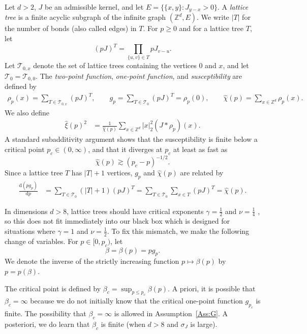 \documentclass[11pt,a4paper]{article}
\numberwithin{equation}{section}
\theoremstyle{plain}
\theoremstyle{definition}
\newcommand\1{\mathds{1}}
\begin{document}
Let $d > 2$, $J$ be an admissible kernel, and let $E = \{\{x,y\}: J_{y-x}>0 \}$.
A \emph{lattice tree} is a finite acyclic subgraph of
the infinite graph $(\mathbb Z^d, E)$.
We write $|T|$ for the number of bonds (also called edges) in $T$.
For $p \ge 0$ and for a lattice tree $T$, let
\begin{equation}
    (p J)^T = \prod_{\{u,v\} \in T}p J_{v-u}.
\end{equation}
Let $\mathcal{T}_{0,x}$ denote the set of lattice trees containing
the vertices $0$ and $x$, and let $\mathcal T_0 = \mathcal T_{0,0}$.
The \emph{two-point function}, \emph{one-point function}, and \emph{susceptibility}
are defined by
\begin{align}
    \rho_p(x) = \sum_{T \in \mathcal{T}_{0,x}} (pJ) ^{T},
    \qquad
    g_p = \sum_{T \in \mathcal{T}_{0}} (pJ) ^{T} = \rho_p(0),
    \qquad
    \hat\chi(p) = \sum_{x\in \mathbb Z^d} \rho_p(x).
\end{align}
We also define
\begin{align}
    \hat\xi(p)^2 &= \frac{1}{\hat\chi(p)}\sum_{x \in \mathbb{Z}^d} |x|_2^2
    (J*\rho_p)(x).
\end{align}
 A standard subadditivity argument  \cite{BFG86,HS90b}
shows that the susceptibility is finite below a critical point $p_c\in (0,\infty)$,
and that it diverges at $p_c$ at least as fast as
\begin{equation}
\label{eq:chihat-diverges}
    \hat\chi(p) \gtrsim (p_c-p)^{-1/2}.
\end{equation}
Since a lattice tree $T$ has $|T|+1$ vertices, $g_p$ and $\hat \chi(p)$ are related by
\begin{align}
\label{eq:dg}
    \frac{\mathrm{d}(pg_p)}{\mathrm{d}p} & = \sum_{T \in \mathcal{T}_{0}}(|T|+1) (pJ)^T
    = \sum_{T \in \mathcal{T}_{0}}\sum_{x\in T} (pJ)^T =\hat\chi(p).
\end{align}

In dimensions $d>8$, lattice trees should have critical exponents
$\gamma = \frac 12$ and $\nu = \frac 14$ \cite{HS90b,HS92c},
so this does not fit immediately into our black box which
is designed for situations where $\gamma =1$ and $\nu = \frac 12$.
To fix this mismatch, we make the following change of variables.
For $p \in [0,p_c)$, let
\begin{equation}
    \beta =\beta(p) = pg_p.
\end{equation}
We denote the inverse
of the strictly increasing function $p\mapsto \beta(p)$
by $p=p(\beta)$.

The critical point is defined by $ \beta_c= \sup_{p \le p_c}\beta(p)$.
 A priori, it is possible that $\beta_c=\infty$
because we do not initially know that the critical one-point function $g_{p_c}$ is finite.
The possibility that $\beta_c=\infty$ is allowed in Assumption~\ref{Ass:G}.
A posteriori, we do learn that $\beta_c$ is finite (when $d>8$ and $\sigma_J$ is large).
\end{document}
